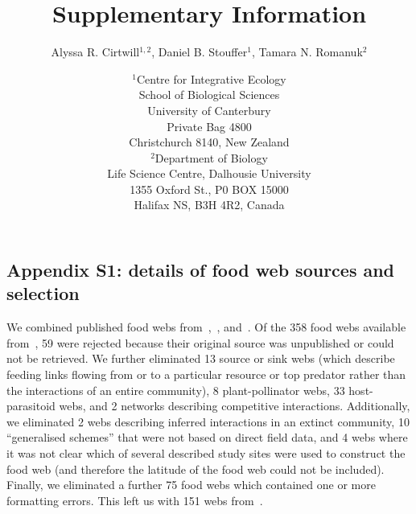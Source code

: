 \documentclass[12pt]{article}
\newcommand{\beginsupplement}{%
        \setcounter{table}{0}
        \renewcommand{\thetable}{S\arabic{table}}%
        \setcounter{figure}{0}
        \renewcommand{\thefigure}{S\arabic{figure}}%
     }
\begin{document}
\title{Supplementary Information}
\author{Alyssa R. Cirtwill$^{1,2}$, Daniel B. Stouffer$^{1}$, Tamara N. Romanuk$^{2}$}
\date{\footnotesize$^1$Centre for Integrative Ecology\\School of Biological Sciences\\University of Canterbury\\
Private Bag 4800\\Christchurch 8140, New Zealand \\
\medskip$^2$Department of Biology\\
Life Science Centre, Dalhousie University\\1355 Oxford St., P0 BOX 15000\\
Halifax NS, B3H 4R2, Canada\\}



\maketitle
\baselineskip=8.5mm

\vspace{0.4 in}
\beginsupplement
\linenumbers

\subsection*{Appendix S1: details of food web sources and selection}

  We combined published food webs from~\cite{GlobalWeb},~\cite{Riede2011},
  and~\cite{Dunne2013}. Of the 358 food webs available
  from~\cite{GlobalWeb}, 59 were rejected because their original source was
  unpublished or could not be retrieved. We further eliminated 13 source or
  sink webs (which describe feeding links flowing from or to a particular
  resource or top predator rather than the interactions of an entire
  community), 8 plant-pollinator webs, 33 host-parasitoid webs, and 2 networks
  describing competitive interactions. Additionally, we eliminated 2 webs
  describing  inferred interactions in an extinct community, 10 ``generalised
  schemes'' that were not based on direct field data, and 4 webs where it was
  not clear which of several described study sites were used to construct the
  food web (and therefore the latitude of the food web could not be
  included). Finally, we eliminated a further 75 food webs which contained one or more formatting errors. This left us with 151 webs from~\cite{GlobalWeb}.
\end{document}
